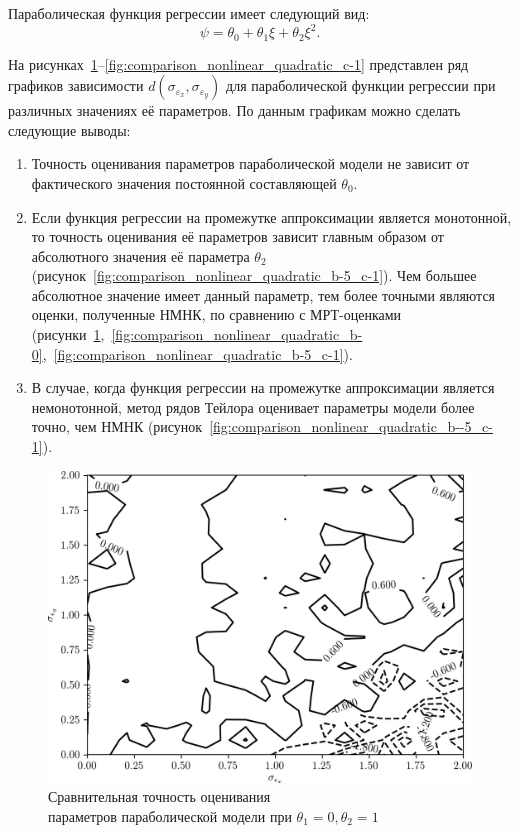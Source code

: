 Параболическая функция регрессии имеет следующий вид:
\[ \psi = \theta_0 + \theta_1 \xi + \theta_2 \xi^2. \]

На рисунках~\ref{fig:comparison_nonlinear_quadratic_b-0_c-1}--\ref{fig:comparison_nonlinear_quadratic_c-1} представлен ряд графиков зависимости
\( d(\sigma_{\varepsilon_x}, \sigma_{\varepsilon_y}) \)
для параболической функции регрессии при различных значениях её параметров.
По данным графикам можно сделать следующие выводы:
\begin{enumerate}
\item Точность оценивания параметров параболической модели не зависит
  от фактического значения постоянной составляющей \( \theta_0 \).
\item Если функция регрессии на промежутке аппроксимации является монотонной,
  то точность оценивания её параметров зависит главным образом от
  абсолютного значения её параметра \( \theta_2 \)
  (рисунок~\ref{fig:comparison_nonlinear_quadratic_b-5_c-1}).
  Чем большее абсолютное значение имеет данный параметр,
  тем более точными являются оценки, полученные НМНК,
  по сравнению с МРТ-оценками
  (рисунки~\ref{fig:comparison_nonlinear_quadratic_b-0_c-1},~\ref{fig:comparison_nonlinear_quadratic_b-0},~\ref{fig:comparison_nonlinear_quadratic_b-5_c-1}).
\item В случае, когда функция регрессии на промежутке аппроксимации является немонотонной,
  метод рядов Тейлора оценивает параметры модели более точно, чем НМНК
  (рисунок~\ref{fig:comparison_nonlinear_quadratic_b--5_c-1}).
\end{enumerate}

\begin{figure}[b]
  \centering
  \includegraphics[width=135mm]{fig/nonlinear/quadratic/a-0_b-0_c-1.png}
  \caption{
    Сравнительная точность оценивания \\
    параметров параболической модели при \( \theta_1 = 0, \theta_2 = 1 \)
  }\label{fig:comparison_nonlinear_quadratic_b-0_c-1}
\end{figure}

